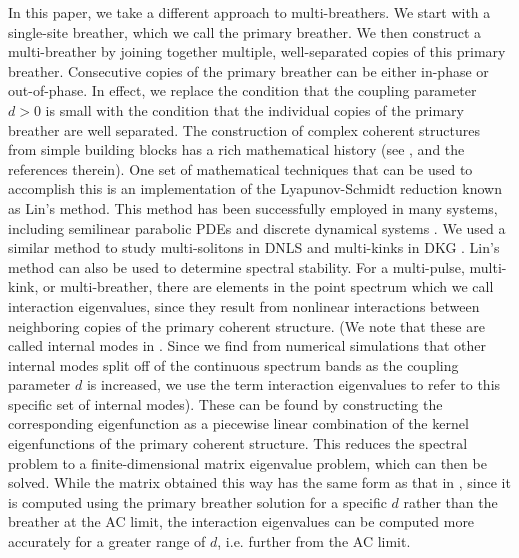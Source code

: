 \documentclass[12pt,reqno]{amsart}
\theoremstyle{definition}
\begin{document}
In this paper, we take a different approach to multi-breathers. We start with a single-site breather, which we call the primary breather. We then construct a multi-breather by joining together multiple, well-separated copies of this primary breather. Consecutive copies of the primary breather can be either in-phase or out-of-phase. In effect, we replace the condition that the coupling parameter $d>0$ is small with the condition that the individual copies of the primary breather are well separated. 
The construction of complex coherent structures from simple building blocks has a rich mathematical history (see \cite{Sandstede1998}, and the references therein). One set of mathematical techniques that can be used to accomplish this is an implementation of the Lyapunov-Schmidt reduction known as Lin's method. This method has been successfully employed in many systems, including semilinear parabolic PDEs \cite{Sandstede1998} and discrete dynamical systems \cite{Knobloch2000}. We used a similar method to study  multi-solitons in DNLS \cite{Parker2020} and multi-kinks in DKG \cite{Parker2021}. Lin's method can also be used to determine spectral stability. For a multi-pulse, multi-kink, or multi-breather, there are elements in the point spectrum which we call interaction eigenvalues, since they result from nonlinear interactions between neighboring copies of the primary coherent structure. (We note that these are called internal modes in \cite{cuevas-maraver2016}. Since we find from numerical simulations that other internal modes split off of the continuous spectrum bands as the coupling parameter $d$ is increased, we use the term interaction eigenvalues to refer to this specific set of internal modes).
These can be found by constructing the corresponding eigenfunction as a piecewise linear combination of the kernel eigenfunctions of the primary coherent structure. This reduces the spectral problem to a finite-dimensional matrix eigenvalue problem, which can then be solved. While the matrix obtained this way has the same form as that in \cites{Pelinovsky2012,cuevas-maraver2016}, since it is computed using the primary breather solution for a specific $d$ rather than the breather at the AC limit, the interaction eigenvalues can be computed more accurately for a greater range of $d$, i.e. further from the AC limit.
\end{document}
